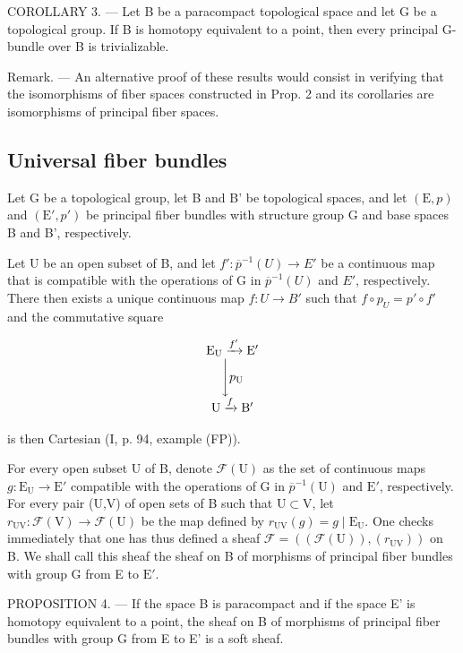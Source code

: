 COROLLARY 3. --- Let B be a paracompact topological space and let G be a topological group. If B is homotopy equivalent to a point, then every principal G-bundle over B is trivializable.

Remark. --- An alternative proof of these results would consist in verifying that the isomorphisms of fiber spaces constructed in Prop. 2 and its corollaries are isomorphisms of principal fiber spaces.

\subsection{Universal fiber bundles}

Let G be a topological group, let B and B' be topological spaces, and let \((\mathrm{E}, p)\) and \((\mathrm{E}', p')\) be principal fiber bundles with structure group G and base spaces B and B', respectively.

Let U be an open subset of B, and let \(f'\colon \overline{p}^{-1}(U) \to E'\) be a continuous map that is compatible with the operations of G in \(\overline{p}^{-1}(U)\) and \(E'\), respectively. There then exists a unique continuous map \(f\colon U \to B'\) such that \(f \circ p_{U} = p' \circ f'\) and the commutative square

\[
\begin{array}{c} \mathrm {E_ {U}} \xrightarrow {f ^ {\prime}} \mathrm {E^ {\prime}} \\ \Biggl \downarrow p _ {\mathrm{U}} \\ \mathrm{U} \xrightarrow {f} \mathrm {B^ {\prime}} \end{array}
\]

is then Cartesian (I, p. 94, example (FP)).

For every open subset U of B, denote \(\mathcal{F}(\mathrm{U})\) as the set of continuous maps \(g\colon \mathrm{E}_{\mathrm{U}}\to \mathrm{E}'\) compatible with the operations of G in \(\overline{p}^{-1}(\mathrm{U})\) and \(\mathrm{E}'\), respectively. For every pair (U,V) of open sets of B such that \(\mathrm{U}\subset \mathrm{V}\), let \(r_{\mathrm{UV}}\colon \mathcal{F}(\mathrm{V})\to \mathcal{F}(\mathrm{U})\) be the map defined by \(r_{\mathrm{UV}}(g) = g\mid \mathrm{E}_{\mathrm{U}}\). One checks immediately that one has thus defined a sheaf \(\mathcal{F} = ((\mathcal{F}(\mathrm{U})),(r_{\mathrm{UV}}))\) on B. We shall call this sheaf the sheaf on B of morphisms of principal fiber bundles with group G from E to \(\mathrm{E}'\).

PROPOSITION 4. --- If the space B is paracompact and if the space E' is homotopy equivalent to a point, the sheaf on B of morphisms of principal fiber bundles with group G from E to E' is a soft sheaf.

